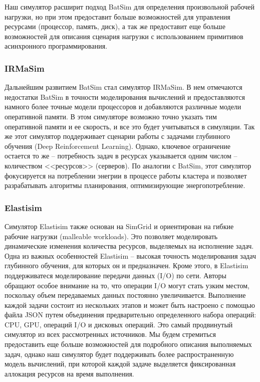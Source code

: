 Наш симулятор расширит подход BatSim для определения произвольной рабочей нагрузки, но при этом предоставит больше возможностей для управления ресурсами (процессор, память, диск), а так же предоставит еще больше возможностей для описания сценария нагрузки с использованием примитивов асинхронного программирования.

\subsubsection{IRMaSim}

Дальнейшим развитием BatSim стал симулятор IRMaSim\cite{irmasim-article}. В нем отмечаются недостатки BatSim в точности моделирования вычислений и предоставляются намного более точные модели процессоров и добавляются различные модели оперативной памяти. В этом симуляторе возможно точно указать тим оперативной памяти и ее скорость, и все это будет учитываться в симуляции. Так же этот симулятор поддерживает сценарии работы с задачами глубинного обучения (Deep Reinforcement Learning). Однако, ключевое ограничение остается то же -- потребность задач в ресурсах указывается одним числом -- количеством <<ресурсов>> (серверов). По аналогии с BatSim, этот симулятор фокусируется на потреблении энегрии в процессе работы кластера и позволяет разрабатывать алгоритмы планирования, оптимизирующие энергопотребление. 

\subsubsection{Elastisim}

Симулятор Elastisim\cite{elastisim-article} также основан на SimGrid и ориентирован на гибкие рабочие нагрузки (malleable workloads). Это позволяет моделировать динамические изменения количества ресурсов, выделяемых на исполнение задач. Одна из важных особенностей Elastisim -- высокая точность моделирования задач глубинного обучения, для которых он и предназначен. Кроме этого, в Elastisim поддерживатеся моделирование передачи данных (I/O) по сети. Авторы обращают особое внимание на то, что операции I/O могут стать узким местом, поскольку объем передаваемых данных постоянно увеличивается. Выполнение каждой задачи состоит из нескольких этапов и может быть настроено с помощью файла JSON путем объединения предварительно определенного набора операций: CPU, GPU, операций I/O и дисковых операций. Это самый продвинутый симулятор из всех рассмотренных источников. Мы будем стремиться предоставить еще больше возможностей для подробного описания выполняемых задач, однако наш симулятор будет поддерживать более распространенную модель вычислений, при которой каждой задаче выделяется фиксированная аллокация ресурсов на время выполнения.

